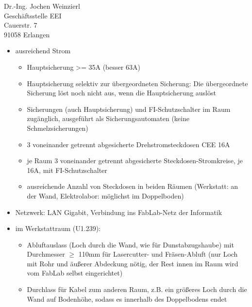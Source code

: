 \documentclass[a4paper,german]{letter}
\begin{document}
\begin{letter}{Dr.-Ing. Jochen Weinzierl\\ Geschäftsstelle EEI\\ Cauerstr. 7\\ 91058 Erlangen}
\begin{itemize}
\item ausreichend Strom
	\begin{itemize}
	\item Hauptsicherung >= 35A (besser 63A)
	\item Hauptsicherung selektiv zur übergeordneten Sicherung: Die übergeordnete Sicherung löst noch nicht aus, wenn die Hauptsicherung auslöst
	\item Sicherungen (auch Hauptsicherung) und FI-Schutzschalter im Raum zugänglich, ausgeführt als Sicherungsautomaten (keine Schmelzsicherungen)
	\item 3 voneinander getrennt abgesicherte Drehstromsteckdosen CEE 16A%
	\item je Raum 3 voneinander getrennt abgesicherte Steckdosen-Stromkreise, je 16A, mit FI-Schutzschalter%
	\item ausreichende Anzahl von Steckdosen in beiden Räumen (Werkstatt: an der Wand, Elektrolabor: möglichst im Doppelboden)
	\end{itemize}

\item Netzwerk: LAN Gigabit, Verbindung ins FabLab-Netz der Informatik %
\item im Werkstattraum (U1.239):
	\begin{itemize}
	\item Abluftauslass (Loch durch die Wand, wie für Dunstabzugshaube) mit Durchmesser $\geq$ 110mm für Lasercutter- und Fräsen-Abluft (nur Loch mit Rohr und äußerer Abdeckung nötig, der Rest innen im Raum wird vom FabLab selbst eingerichtet)
	\item Durchlass für Kabel zum anderen Raum, z.B. ein größeres Loch durch die Wand auf Bodenhöhe, sodass es innerhalb des Doppelbodens endet
	\end{itemize}



\end{itemize}
\end{letter}
\end{document}
